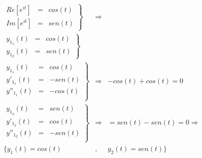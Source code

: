 \documentclass[12pt,spanish,lettersize]{report}
\begin{document}
\begin{eqnarray}
\nonumber \left.
\begin{array}{ccc}
Re[e^{it}]&=&cos(t)\\
Im[e^{it}]&=&sen(t)
\end{array}
\right\}&\Rightarrow\\
\nonumber \left.
\begin{array}{ccc}
y_{1_1}(t)&=&cos(t)\\
y_{1_2}(t)&=&sen(t)
\end{array}
\right\}\\
\nonumber \left.
\begin{array}{ccc}
y_{1_1}(t)&=&cos(t)\\
y'_{1_1}(t)&=&-sen(t)\\
y''_{1_1}(t)&=&-cos(t)\\
\end{array}
\right\}&\Rightarrow&-cos(t)+cos(t)=0\\
\nonumber \left.
\begin{array}{ccc}
y_{1_2}(t)&=&sen(t)\\
y'_{1_2}(t)&=&cos(t)\\
y''_{1_2}(t)&=&-sen(t)\\
\end{array}
\right\}&\Rightarrow&=sen(t)-sen(t)=0\Rightarrow\\
\{y_1(t)=cos(t)&,&y_2(t)=sen(t)\}
\end{eqnarray}
\end{document}

